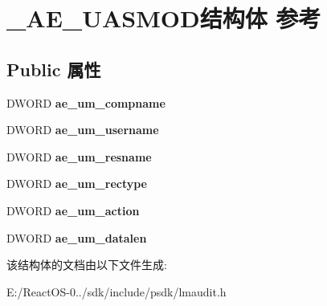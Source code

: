 \hypertarget{struct___a_e___u_a_s_m_o_d}{}\section{\+\_\+\+A\+E\+\_\+\+U\+A\+S\+M\+O\+D结构体 参考}
\label{struct___a_e___u_a_s_m_o_d}
\subsection*{Public 属性}
\begin{DoxyCompactItemize}
\item 
\mbox{\label{struct___a_e___u_a_s_m_o_d_a7a80415a8bf66d6098665edd26c97476}} 
D\+W\+O\+RD {\bfseries ae\+\_\+um\+\_\+compname}
\item 
\mbox{\label{struct___a_e___u_a_s_m_o_d_ab5b7c8f0406fbcd5e295c997c965abc8}} 
D\+W\+O\+RD {\bfseries ae\+\_\+um\+\_\+username}
\item 
\mbox{\label{struct___a_e___u_a_s_m_o_d_ab6e371609abdcf791abae6738b6e13c0}} 
D\+W\+O\+RD {\bfseries ae\+\_\+um\+\_\+resname}
\item 
\mbox{\label{struct___a_e___u_a_s_m_o_d_aaba7199fcc6b993d85c03cc82b45573d}} 
D\+W\+O\+RD {\bfseries ae\+\_\+um\+\_\+rectype}
\item 
\mbox{\label{struct___a_e___u_a_s_m_o_d_a90008e56881ead188b18b748357e0d93}} 
D\+W\+O\+RD {\bfseries ae\+\_\+um\+\_\+action}
\item 
\mbox{\label{struct___a_e___u_a_s_m_o_d_afb4a0eaa60b4268f5e03525a9d41c925}} 
D\+W\+O\+RD {\bfseries ae\+\_\+um\+\_\+datalen}
\end{DoxyCompactItemize}


该结构体的文档由以下文件生成\+:\begin{DoxyCompactItemize}
\item 
E\+:/\+React\+O\+S-\/0../sdk/include/psdk/lmaudit.\+h\end{DoxyCompactItemize}
